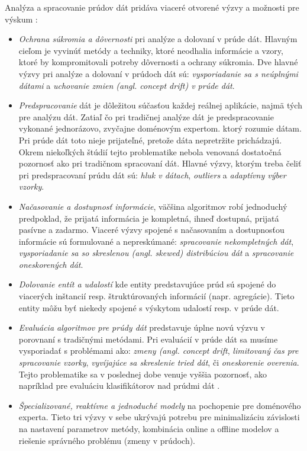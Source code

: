 Analýza a spracovanie prúdov dát pridáva viaceré otvorené výzvy a možnosti pre výskum \citep{krempl2014open}:
\begin{itemize}
	\item \textit{Ochrana súkromia a dôvernosti} pri analýze a dolovaní v prúde dát. Hlavným cieľom je vyvinúť metódy a techniky, ktoré neodhalia informácie a vzory, ktoré by kompromitovali potreby dôvernosti a ochrany súkromia. Dve hlavné výzvy pri analýze a dolovaní v prúdoch dát sú: \textit{vysporiadanie sa s neúplnými dátami} a \textit{uchovanie zmien (angl. concept drift) v prúde dát}.
	\item \textit{Predspracovanie} dát je dôležitou súčasťou každej reálnej aplikácie, najmä tých pre analýzu dát. Zatiaľ čo pri tradičnej analýze dát je predspracovanie vykonané jednorázovo, zvyčajne doménovým expertom. ktorý rozumie dátam. Pri prúde dát toto nieje prijateľné, pretože dáta nepretržite prichádzajú. Okrem niekoľkých štúdií \citep{zliobaite2014adaptive, anagnostopoulos2008deciding} tejto problematike nebola venovaná dostatočná pozornosť ako pri tradičnom spracovaní dát. Hlavné výzvy, ktorým treba čeliť pri predspracovaní prúdu dát sú: \textit{hluk v dátach}, \textit{outliers} a \textit{adaptívny výber vzorky}.
	\item \textit{Načasovanie a dostupnosť informácie}, väčšina algoritmov robí jednoduchý predpoklad, že prijatá informácia je kompletná, ihneď dostupná, prijatá pasívne a zadarmo. Viaceré výzvy spojené s načasovaním a dostupnosťou informácie sú formulované a nepreskúmané: \textit{spracovanie nekompletných dát}, \textit{vysporiadanie sa so skreslenou (angl. skewed) distribúciou dát} a \textit{spracovanie oneskorených dát}.
	\item \textit{Dolovanie entít a udalostí} kde entity predstavujúce prúd sú spojené do viacerých inštancií resp. štruktúrovaných informácií (napr. agregácie). Tieto entity môžu byť niekedy spojené s výskytom udalostí resp. v prúde dát. 
	\item \textit{Evaluácia algoritmov pre prúdy dát} predstavuje úplne novú výzvu v porovnaní s tradičnými metódami. Pri evaluácií v prúde dát sa musíme vysporiadať s problémami ako: \textit{zmeny (angl. concept drift}, \textit{limitovaný čas pre spracovanie vzorky}, \textit{vyvíjajúce sa skreslenie tried dát}, či \textit{oneskorenie overenia}. Tejto problematike sa v poslednej dobe venuje vyššia pozornosť, ako napríklad pre evaluáciu klasifikátorov nad prúdmi dát \citep{bifet2015efficient}.
	\item \textit{Špecializované, reaktívne a jednoduché modely} na pochopenie pre doménového experta. Tieto tri výzvy v sebe ukrývajú potrebu pre minimalizáciu závislosti na nastavení parametrov metódy, kombinácia online a offline modelov a riešenie správného problému (zmeny v prúdoch).
\end{itemize}




